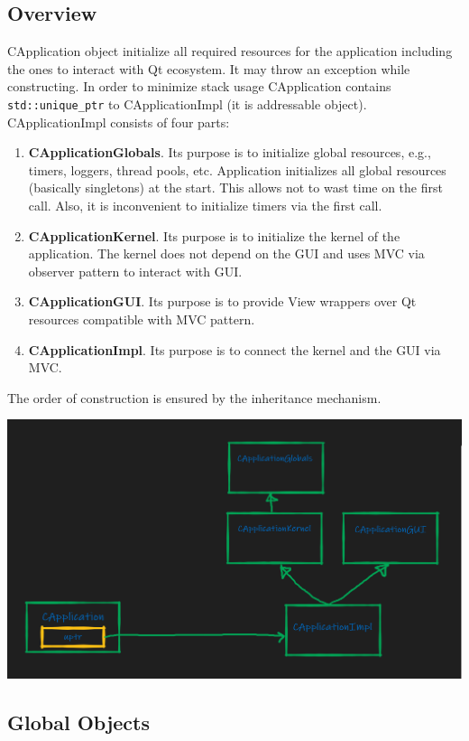 \documentclass{article}
\begin{document}
\subsection{Overview}

CApplication object initialize all required resources for the application including the ones to interact with Qt ecosystem. It may throw an exception while constructing. In order to minimize stack usage CApplication contains \verb"std::unique_ptr" to CApplicationImpl (it is addressable object). CApplicationImpl consists of four parts:
\begin{enumerate}
\item \textbf{CApplicationGlobals}. Its purpose is to initialize global resources, e.g., timers, loggers, thread pools, etc. Application initializes all global resources (basically singletons) at the start. This allows not to wast time on the first call. Also, it is inconvenient to initialize timers via the first call.
\item \textbf{CApplicationKernel}. Its purpose is to initialize the kernel of the application. The kernel does not depend on the GUI and uses MVC via observer pattern to interact with GUI.
\item \textbf{CApplicationGUI}. Its purpose is to provide View wrappers over Qt resources compatible with MVC pattern.
\item \textbf{CApplicationImpl}. Its purpose is to connect the kernel and the GUI via MVC.
\end{enumerate}
The order of construction is ensured by the inheritance mechanism.
\begin{center}
\includegraphics[scale = 0.3]{Figures/CApplicationStructure.png}
\end{center}

\subsection{Global Objects}
\end{document}
